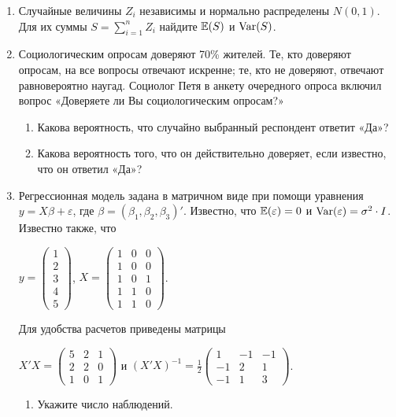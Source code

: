 \documentclass[12pt, a4paper]{article}\usepackage[]{graphicx}\usepackage[]{color}
\begin{document}
\begin{enumerate}
\item Случайные величины $Z_i$ независимы и нормально распределены $N(0,1)$. Для их суммы $S=\sum_{i=1}^n Z_i$ найдите $\mathbb{E}(S)$ и $\operatorname{Var}(S)$.
\item Социологическим опросам доверяют 70\% жителей. Те, кто доверяют
опросам, на все вопросы отвечают искренне; те, кто не доверяют, отвечают равновероятно наугад. Социолог Петя в анкету очередного опроса включил вопрос «Доверяете ли Вы социологическим опросам?»
\begin{enumerate}
\item Какова вероятность, что случайно выбранный респондент ответит «Да»?
\item Какова вероятность того, что он действительно доверяет, если известно, что он ответил
«Да»?
\end{enumerate}
\item Регрессионная модель  задана в матричном виде при помощи уравнения $y=X\beta+\varepsilon$, где $\beta=(\beta_1,\beta_2,\beta_3)'$.
Известно, что $\mathbb{E}(\varepsilon)=0$  и  $\operatorname{Var}(\varepsilon)=\sigma^2\cdot I$.
Известно также, что

$y=\left(
\begin{array}{c}
1\\
2\\
3\\
4\\
5
\end{array}\right)$,
$X=\left(\begin{array}{ccc}
1 & 0 & 0 \\
1 & 0 & 0 \\
1 & 0 & 1 \\
1 & 1 & 0 \\
1 & 1 & 0
\end{array}\right)$.


Для удобства расчетов приведены матрицы


$X'X=\left(
\begin{array}{ccc}
5 & 2 & 1\\
2 & 2 & 0\\
1 & 0 & 1
\end{array}\right)$ и $(X'X)^{-1}=\frac{1}{2}\left(
\begin{array}{ccc}
1 & -1 & -1 \\
-1 & 2 & 1 \\
-1 & 1 & 3
\end{array}\right)$.

\begin{enumerate}
\item Укажите число наблюдений.


\end{enumerate}
\end{enumerate}
\end{document}
